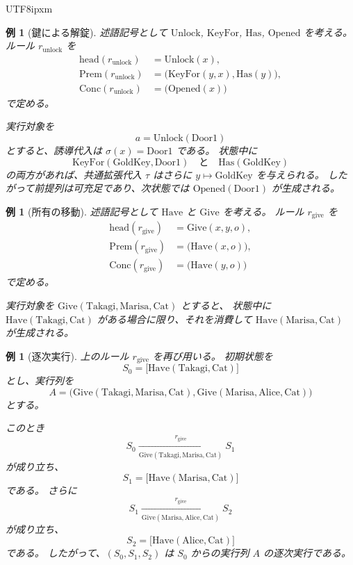 \documentclass[a4paper,11pt]{bxjsarticle}
\newcommand{\JPCJKfamily}{ipxm}
\newtheorem{example}[definition]{例}
\newcommand{\headsym}{\mathrm{head}}
\newcommand{\Prem}{\mathrm{Prem}}
\newcommand{\Conc}{\mathrm{Conc}}
\begin{document}
\begin{CJK}{UTF8}{\JPCJKfamily}
\begin{example}[鍵による解錠]
述語記号として $\mathrm{Unlock}$, $\mathrm{KeyFor}$, $\mathrm{Has}$, $\mathrm{Opened}$ を考える。
ルール $r_{\mathrm{unlock}}$ を
\begin{align*}
\headsym(r_{\mathrm{unlock}}) &= \mathrm{Unlock}(x), \\
\Prem(r_{\mathrm{unlock}}) &= \bigl(\mathrm{KeyFor}(y,x),\mathrm{Has}(y)\bigr), \\
\Conc(r_{\mathrm{unlock}}) &= \bigl(\mathrm{Opened}(x)\bigr)
\end{align*}
で定める。

実行対象を
\[
a = \mathrm{Unlock}(\mathrm{Door1})
\]
とすると、誘導代入は $\sigma(x)=\mathrm{Door1}$ である。
状態中に
\[
\mathrm{KeyFor}(\mathrm{GoldKey},\mathrm{Door1})
\quad\text{と}\quad
\mathrm{Has}(\mathrm{GoldKey})
\]
の両方があれば、共通拡張代入 $\tau$ はさらに $y \mapsto \mathrm{GoldKey}$ を与えられる。
したがって前提列は可充足であり、次状態では $\mathrm{Opened}(\mathrm{Door1})$ が生成される。
\end{example}

\begin{example}[所有の移動]
述語記号として $\mathrm{Have}$ と $\mathrm{Give}$ を考える。
ルール $r_{\mathrm{give}}$ を
\begin{align*}
\headsym(r_{\mathrm{give}}) &= \mathrm{Give}(x,y,o), \\
\Prem(r_{\mathrm{give}}) &= \bigl(\mathrm{Have}(x,o)\bigr), \\
\Conc(r_{\mathrm{give}}) &= \bigl(\mathrm{Have}(y,o)\bigr)
\end{align*}
で定める。

実行対象を $\mathrm{Give}(\mathrm{Takagi},\mathrm{Marisa},\mathrm{Cat})$ とすると、
状態中に $\mathrm{Have}(\mathrm{Takagi},\mathrm{Cat})$ がある場合に限り、それを消費して $\mathrm{Have}(\mathrm{Marisa},\mathrm{Cat})$ が生成される。
\end{example}

\begin{example}[逐次実行]
上のルール $r_{\mathrm{give}}$ を再び用いる。
初期状態を
\[
S_0=
\bigl[
\mathrm{Have}(\mathrm{Takagi},\mathrm{Cat})
\bigr]
\]
とし、実行列を
\[
A=
\bigl(
\mathrm{Give}(\mathrm{Takagi},\mathrm{Marisa},\mathrm{Cat}),
\mathrm{Give}(\mathrm{Marisa},\mathrm{Alice},\mathrm{Cat})
\bigr)
\]
とする。

このとき
\[
S_0 \xrightarrow[\mathrm{Give}(\mathrm{Takagi},\mathrm{Marisa},\mathrm{Cat})]{r_{\mathrm{give}}} S_1
\]
が成り立ち、
\[
S_1=
\bigl[
\mathrm{Have}(\mathrm{Marisa},\mathrm{Cat})
\bigr]
\]
である。
さらに
\[
S_1 \xrightarrow[\mathrm{Give}(\mathrm{Marisa},\mathrm{Alice},\mathrm{Cat})]{r_{\mathrm{give}}} S_2
\]
が成り立ち、
\[
S_2=
\bigl[
\mathrm{Have}(\mathrm{Alice},\mathrm{Cat})
\bigr]
\]
である。
したがって、$(S_0,S_1,S_2)$ は $S_0$ からの実行列 $A$ の逐次実行である。
\end{example}


\end{CJK}
\end{document}
